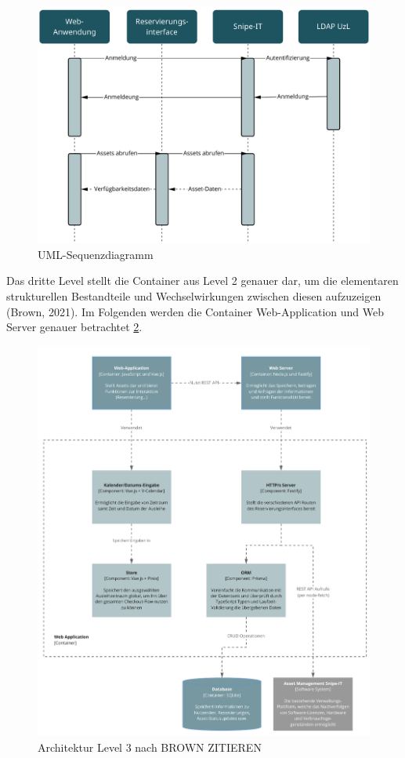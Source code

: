 \begin{figure}[h]
    \centering
    \includegraphics[scale=0.45]{Bilder/uml.pdf}
    \caption[UML-Sequenzdiagramm]{UML-Sequenzdiagramm}
    \label{fig:uml}
\end{figure}

{\sffamily\color{maincolor}{Level 3: Components}}

Das dritte Level stellt die Container aus Level 2 genauer dar, um die elementaren strukturellen
Bestandteile und Wechselwirkungen zwischen diesen aufzuzeigen (Brown, 2021). Im Folgenden werden die
Container Web-Application und Web Server genauer betrachtet \ref{fig:level3}.

\begin{figure}[h]
    \centering
    \includegraphics[scale=0.9]{Bilder/level3.pdf}
    \caption[Architektur Level 3]{Architektur Level 3 nach BROWN ZITIEREN}
    \label{fig:level3}
\end{figure}

